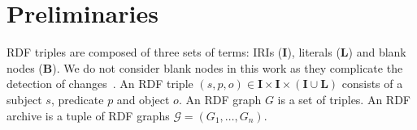 \documentclass{llncs}
\newcommand{\B}{\ensuremath{\mathbf{B}}\xspace}
\newcommand{\I}{\ensuremath{\mathbf{I}}\xspace}
\renewcommand{\L}{\ensuremath{\mathbf{L}}\xspace}
\begin{document}










\section{Preliminaries}

RDF triples are composed of three sets of terms: IRIs (\I), literals (\L) and blank nodes (\B). We do not consider blank nodes in this work as they complicate the detection of changes~\cite{ZeginisTC11}. An RDF triple $(s,p,o) \in \I \times \I \times (\I \cup \L)$ consists of a subject $s$, predicate $p$ and object $o$. An RDF graph $G$ is a set of triples. An RDF archive is a tuple of RDF graphs $\mathcal{G} = (G_1,\ldots,G_n)$.
\end{document}
